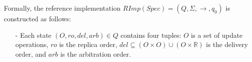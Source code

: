 Formally, the reference implementation $\mathit{RImp}(\mathit{Spec}) = (Q,\Sigma,\rightarrow,q_0)$ is constructed as follows: 


\begin{itemize}
\setlength{\itemsep}{0.5pt}
\item[-] {\color {red}Each state $(O,\mathit{ro},\mathit{del},\mathit{arb}) \in Q$ contains four tuples: $O$ is a set of update operations, $\mathit{ro}$ is the replica order, $\mathit{del} \subseteq (O \times O) \cup (O \times \mathbb{R})$ is the delivery order, and $\mathit{arb}$ is the arbitration order.} 






\end{itemize}
